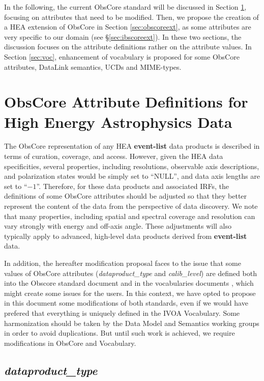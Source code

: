 \documentclass[11pt,a4paper]{ivoa}
\begin{document}
In the following, the current ObsCore standard will be discussed in Section \ref{sec:obscore}, focusing on attributes that need to be modified. Then, we propose the creation of a \gls{HEA} extension of ObsCore in Section \ref{sec:obscoreext}, as some attributes are very specific to our domain (see \S\ref{sec:ibscoreext}). In these two sections, the discussion focuses on the attribute definitions rather on the attribute values. In Section \ref{sec:voc}, enhancement of vocabulary is proposed for some ObsCore attributes, DataLink semantics, UCDs and MIME-types.

\section{ObsCore Attribute Definitions for High Energy Astrophysics Data}
\label{sec:obscore}

The ObsCore representation of any \gls{HEA} \textbf{event-list} data products is described in terms of curation, coverage, and access. However, given the \gls{HEA} data specificities, several properties, including resolutions, observable axis descriptions, and polarization states would be simply set to ``NULL'', and data axis lengths are set to ``$-1$''.  Therefore, for these data products and associated \glspl{IRF}, the definitions of some ObsCore attributes should be adjusted so that they better represent the content of the data from the perspective of data discovery. We note that many properties, including spatial and spectral coverage and resolution can vary strongly with energy and off-axis angle. These adjustments will also typically apply to advanced, high-level data products derived from \textbf{event-list} data.

In addition, the hereafter modification proposal faces to the issue that some values of ObsCore attributes ({\em dataproduct\_type} and {\em calib\_level}) are defined both into the Obscore standard document \citep{2017ivoa.spec.0509L} and in the vocabularies documents \citep{2023ivoa.spec.0206D, 2021ivoa.spec.0525D}, which might create some issues for the users. In this context, we have opted to propose  in this document some modifications of both standards, even if we would have prefered that everything is uniquely defined in the \gls{IVOA} Vocabulary. Some harmonization should be taken by the Data Model and Semantics working groups in order to avoid duplications. But until such work is achieved, we require modifications in ObsCore and Vocabulary.

\subsection{{\em dataproduct\_type}}
\label{sec:dataproduct_type}
\end{document}
